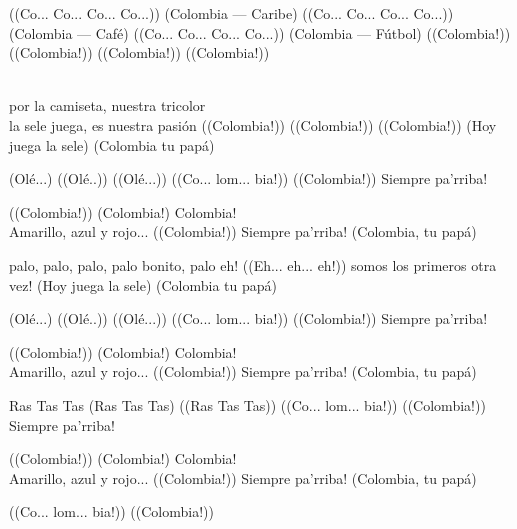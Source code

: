 \begin{lyrics}
 ((Co... Co... Co... Co...))  (Colombia — Caribe)
 ((Co... Co... Co... Co...))  (Colombia — Café)
 ((Co... Co... Co... Co...))  (Colombia — Fútbol)
 ((Colombia!)) ((Colombia!)) ((Colombia!)) ((Colombia!))

\\
por la camiseta, nuestra tricolor\\
la sele juega, es nuestra pasión 
 ((Colombia!)) ((Colombia!)) ((Colombia!))
 (Hoy juega la sele)
(Colombia tu papá)

(Olé...) ((Olé..)) ((Olé...))
((Co... lom... bia!)) ((Colombia!))
 Siempre pa'rriba!

 ((Colombia!))  (Colombia!)  Colombia!\\
Amarillo, azul y rojo...  ((Colombia!))
 Siempre pa'rriba!  (Colombia, tu papá)

 palo, palo, palo, palo bonito, palo eh!
 ((Eh... eh... eh!))
 somos los primeros otra vez!
 (Hoy juega la sele)
(Colombia tu papá)

 (Olé...)  ((Olé..)) ((Olé...))
((Co... lom... bia!)) ((Colombia!))
 Siempre pa'rriba!

 ((Colombia!))  (Colombia!)  Colombia!\\
Amarillo, azul y rojo...  ((Colombia!))
 Siempre pa'rriba!  (Colombia, tu papá)

 Ras Tas Tas
 (Ras Tas Tas)
 ((Ras Tas Tas))
((Co... lom... bia!)) ((Colombia!))
 Siempre pa'rriba!

 ((Colombia!))  (Colombia!)  Colombia!\\
Amarillo, azul y rojo...  ((Colombia!))
 Siempre pa'rriba!  (Colombia, tu papá)

((Co... lom... bia!)) ((Colombia!))
\end{lyrics}

